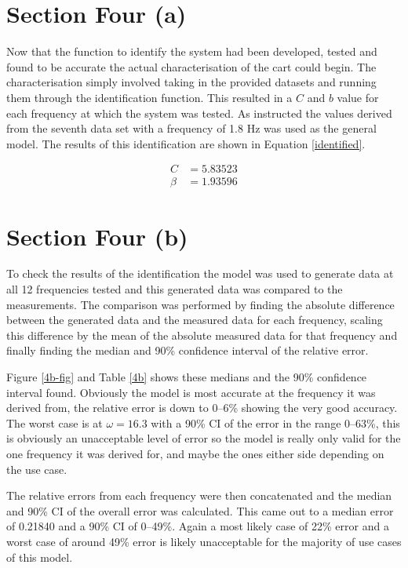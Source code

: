\section*{Section Four (a)}

Now that the function to identify the system had been developed, tested and
found to be accurate the actual characterisation of the cart could begin.  The
characterisation simply involved taking in the provided datasets and running them
through the identification function.  This resulted in a $C$ and $b$ value for
each frequency at which the system was tested.  As instructed the values derived
from the seventh data set with a frequency of 1.8 Hz was used as the general
model.  The results of this identification are shown in Equation
\eqref{identified}.

\begin{equation}\label{identified}
\begin{aligned}
  C     &= 5.83523 \\
  \beta &= 1.93596
\end{aligned}
\end{equation}


\section*{Section Four (b)}

To check the results of the identification the model was used to generate data
at all 12 frequencies tested and this generated data was compared to the
measurements.  The comparison was performed by finding the absolute difference
between the generated data and the measured data for each frequency, scaling
this difference by the mean of the absolute measured data for that frequency and
finally finding the median and 90\% confidence interval of the relative error.

Figure \ref{4b-fig} and Table \ref{4b} shows these medians and the 90\%
confidence interval found.  Obviously the model is most accurate at the
frequency it was derived from, the relative error is down to 0--6\% showing the
very good accuracy.  The worst case is at $\omega = 16.3$ with a 90\% CI of the
error in the range 0--63\%, this is obviously an unacceptable level of error so
the model is really only valid for the one frequency it was derived for, and
maybe the ones either side depending on the use case.

The relative errors from each frequency were then concatenated and the median
and 90\% CI of the overall error was calculated.  This came out to a median
error of 0.21840 and a 90\% CI of 0--49\%.  Again a most likely case of 22\%
error and a worst case of around 49\% error is likely unacceptable for the
majority of use cases of this model.


